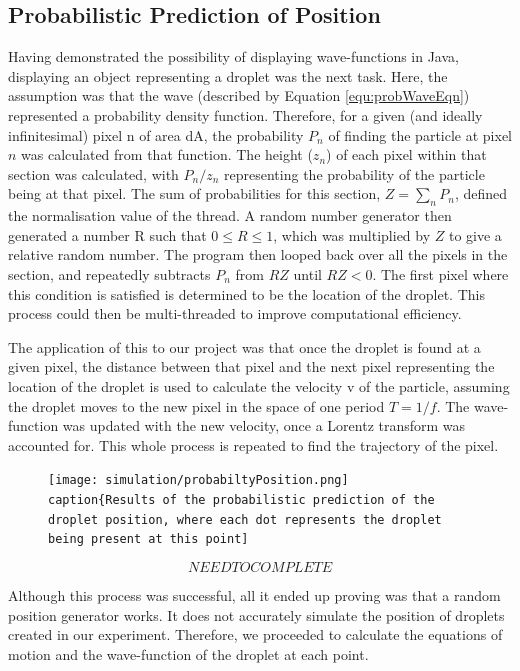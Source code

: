 \subsection{Probabilistic Prediction of Position}
Having demonstrated the possibility of displaying wave-functions in Java, displaying an object representing a droplet was the next task. Here, the assumption was that the wave (described by Equation \ref{equ:probWaveEqn}) represented a probability density function. Therefore, for a given (and ideally infinitesimal) pixel n of area dA, the probability $P_n$ of finding the particle at pixel $n$ was calculated from that function. The height ($z_n$) of each pixel within that section was calculated, with ${P_n}/{z_n}$ representing the probability of the particle being at that pixel. The sum of probabilities for this section, $Z=\sum_n{P_n}$, defined the normalisation value of the thread. A random number generator then generated a number R such that $0\leq R \leq 1$, which was multiplied by $Z$ to give a relative random number. The program then looped back over all the pixels in the section, and repeatedly subtracts $P_n$ from $RZ$ until $RZ<0$. The first pixel where this condition is satisfied is determined to be the location of the droplet. This process could then be multi-threaded to improve computational efficiency.

The application of this to our project was that once the droplet is found at a given pixel, the distance between that pixel and the next pixel representing the location of the droplet is used to calculate the velocity v of the particle, assuming the droplet moves to the new pixel in the space of one period $T=1/f$. The wave-function was updated with the new velocity, once a Lorentz transform was accounted for. This whole process is repeated to find the trajectory of the pixel.

\begin{figure}
\centering
\texttt{[image: simulation/probabiltyPosition.png]
\\caption\{Results of the probabilistic prediction of the droplet position, where each dot represents the droplet being present at this point]}
\label{fig:probabilisticPrediction}
\end{figure}

\begin{equation}
    NEED TO COMPLETE
    \label{equ:probWaveEqn}
\end{equation}

Although this process was successful, all it ended up proving was that a random position generator works. It does not accurately simulate the position of droplets created in our experiment. Therefore, we proceeded to calculate the equations of motion and the wave-function of the droplet at each point.






